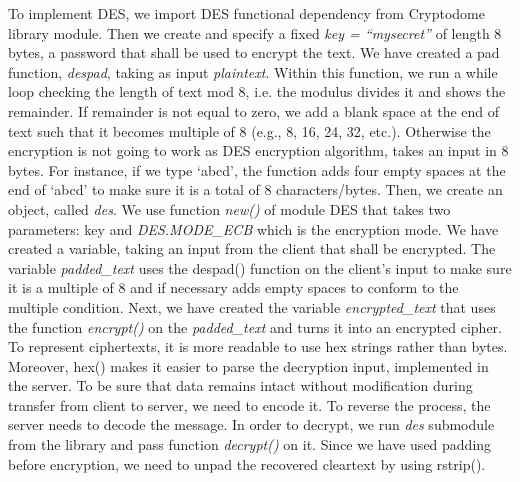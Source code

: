 To implement DES, we import DES functional dependency from Cryptodome library module. Then we create and specify a fixed \textit{key = “mysecret”} of length 8 bytes, a password that shall be used to encrypt the text. We have created a pad function, \textit{despad}, taking as input \textit{plaintext}. Within this function, we run a while loop checking the length of text mod 8, i.e. the modulus divides it and shows the remainder. If remainder is not equal to zero, we add a blank space at the end of text such that it becomes multiple of 8 (e.g., 8, 16, 24, 32, etc.). Otherwise the encryption is not going to work as DES encryption algorithm, takes an input in 8 bytes. For instance, if we type ‘abcd’, the function adds four empty spaces at the end of ‘abcd’ to make sure it is a total of 8 characters/bytes. Then, we create an object, called \textit{des}. We use function \textit{new()} of module DES that takes two parameters: key and \textit{DES.MODE\_ECB} which is the encryption mode. We have created a variable, taking an input from the client that shall be encrypted. The variable  \textit{padded\_text} uses the despad() function on the client's input to make sure it is a multiple of 8 and if necessary adds empty spaces to conform to the multiple condition. Next, we have created the variable \textit{encrypted\_text} that uses the function \textit{encrypt()} on the \textit{padded\_text} and turns it into an encrypted cipher. To represent ciphertexts, it is more readable to use hex strings rather than bytes. Moreover, hex() makes it easier to parse the decryption input, implemented in the server. To be sure that data remains intact without modification during transfer from client to server, we need to encode it. To reverse the process, the server needs to decode the message. In order to decrypt, we run \textit{des} submodule from the library and pass function  \textit{decrypt()} on it. Since we have used padding before encryption, we need to unpad the recovered cleartext by using rstrip(). 

